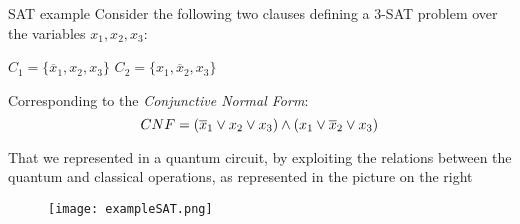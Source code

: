 		\begin{frame}{SAT example}
			\small
			Consider the following two clauses defining a 3-SAT problem over the variables $x_1, x_2, x_3$:
			\begin{center}
				$C_1=\{\overline{x}_1, x_2, x_3\}$
				\hspace{0.5cm}
				$C_2=\{x_1, \overline{x}_2, x_3\}$
			\end{center} 
			Corresponding to the \emph{Conjunctive Normal Form}:
			\begin{equation*}
				\centering
				CNF=(\overline{x}_1\lor x_2\lor x_3)\land(x_1\lor\overline{x}_2\lor x_3)
			\end{equation*}
			\vspace{1cm}
			\begin{minipage}{0.38\textwidth}
				That we represented in a quantum circuit, by exploiting the relations between the quantum and classical operations, as represented in the picture on the right
				\vspace{1.2cm}
			\end{minipage}
			\hfill
			\begin{minipage}{0.6\textwidth}
				\centering
				\begin{figure}[h]
					\centering
					\texttt{[image: exampleSAT.png]}
				\end{figure}
			\end{minipage}
		\end{frame}
	
